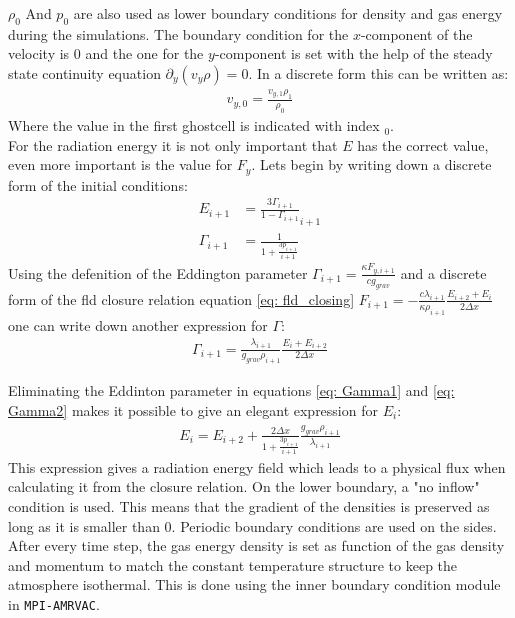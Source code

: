 $\rho_0$ And $p_0$ are also used as lower boundary conditions for density and gas energy during the simulations. The  boundary condition for the $x$-component of the velocity is $0$ and the one for the $y$-component is set with the help of the steady state continuity equation $\partial_y(v_y \rho) = 0$. In a discrete form this can be written as:
\begin{align}
v_{y,0} = \frac{v_{y,1} \rho_1}{\rho_0}
\end{align}
Where the value in the first ghostcell is indicated with index $_0$.\\
For the radiation energy it is not only important that $E$ has the correct value, even more important is the value for $F_y$. Lets begin by writing down a discrete form of the initial conditions:
\begin{align}
E_{i+1} &= \frac{3 \Gamma_{i+1}}{1-\Gamma_{i+1}}_{i+1} \\
\Gamma_{i+1} &= \frac{1}{1 + \frac{3 p_{i+1}}{i+1}} \label{eq: Gamma1}
\end{align}
Using the defenition of the Eddington parameter $\Gamma_{i+1} = \frac{\kappa F_{y,i+1}}{c g_{grav}}$ and a discrete form of the fld closure relation equation \eqref{eq: fld_closing} $F_{i+1} = -\frac{c \lambda_{i+1}}{\kappa \rho_{i+1}} \frac{E_{i+2} + E_{i}}{2 \Delta x}$ one can write down another expression for $\Gamma$:
\begin{align}
\Gamma_{i+1} = \frac{\lambda_{i+1}}{g_{grav}\rho_{i+1}}\frac{E_i + E_{i+2}}{2 \Delta x} \label{eq: Gamma2}
\end{align}

Eliminating the Eddinton parameter in equations \ref{eq: Gamma1} and \eqref{eq: Gamma2} makes it possible to give an elegant expression for $E_i$:
\begin{align}
E_i = E_{i+2} + \frac{2 \Delta x}{1 + \frac{3 p_{i+1}}{i+1}}  \frac{g_{grav} \rho_{i+1}}{\lambda_{i+1}}  
\end{align}
This expression gives a radiation energy field which leads to a physical flux when calculating it from the closure relation. On the lower boundary, a "no inflow" condition is used. This means that the gradient of the densities is preserved as long as it is smaller than $0$. Periodic boundary conditions are used on the sides. \\ 

After every time step, the gas energy density is set as function of the gas density and momentum to match the constant temperature structure to keep the atmosphere isothermal. This is done using the inner boundary condition module in \texttt{MPI-AMRVAC}.\\

